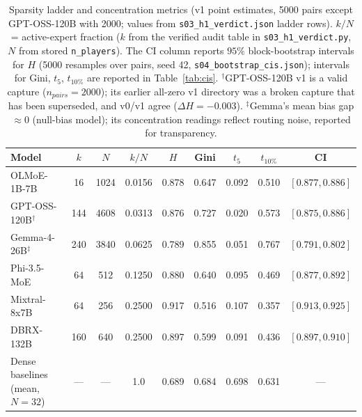 \documentclass[sigconf]{acmart}
\begin{document}
\begin{table}[t]
\centering\small
\begin{tabular}{lcccccccc}
\toprule
Model & $k$ & $N$ & $k/N$ & $H$ & Gini & $t_5$ & $t_{10\%}$ & CI \\
\midrule
OLMoE-1B-7B          & 16  & 1024 & 0.0156 & 0.878 & 0.647 & 0.092 & 0.510 & $[0.877,0.886]$ \\
GPT-OSS-120B$^{\dagger}$ & 144 & 4608 & 0.0313 & 0.876 & 0.727 & 0.020 & 0.573 & $[0.875,0.886]$ \\
Gemma-4-26B$^{\ddagger}$ & 240 & 3840 & 0.0625 & 0.789 & 0.855 & 0.051 & 0.767 & $[0.791,0.802]$ \\
Phi-3.5-MoE         & 64  & 512  & 0.1250 & 0.880 & 0.640 & 0.095 & 0.469 & $[0.877,0.892]$ \\
Mixtral-8x7B        & 64  & 256  & 0.2500 & 0.917 & 0.516 & 0.107 & 0.357 & $[0.913,0.925]$ \\
DBRX-132B           & 160 & 640  & 0.2500 & 0.897 & 0.599 & 0.091 & 0.436 & $[0.897,0.910]$ \\
\midrule
Dense baselines (mean, $N{=}32$) & --- & --- & 1.0 & 0.689 & 0.684 & 0.698 & 0.631 & --- \\
\bottomrule
\end{tabular}
\caption{Sparsity ladder and concentration metrics (v1 point estimates,
5000 pairs except GPT-OSS-120B with 2000; values from
\texttt{s03\_h1\_verdict.json} ladder rows). $k/N$ = active-expert fraction
($k$ from the verified audit table in \texttt{s03\_h1\_verdict.py}, $N$ from
stored \texttt{n\_players}). The CI column reports $95\%$ block-bootstrap
intervals for $H$ (5000 resamples over pairs, seed 42,
\texttt{s04\_bootstrap\_cis.json}); intervals for Gini, $t_5$, $t_{10\%}$
are reported in Table~\ref{tab:cis}. $^{\dagger}$GPT-OSS-120B v1 is a valid
capture ($n_{pairs}=2000$); its earlier all-zero v1 directory was a broken
capture that has been superseded, and v0/v1 agree ($\Delta H = -0.003$).
$^{\ddagger}$Gemma's mean bias gap $\approx 0$ (null-bias model); its
concentration readings reflect routing noise, reported for transparency.}
\label{tab:ladder}
\end{table}
\end{document}
